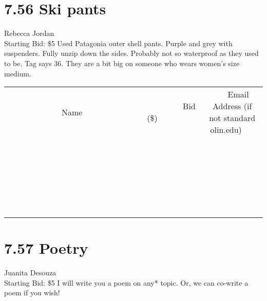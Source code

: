 \documentclass[11pt]{article}
\begin{document}
\section*{7.56 Ski pants}
Rebecca Jordan
\\
Starting Bid: \$5
\newline
Used Patagonia outer shell pants. Purple and grey with suspenders. Fully unzip down the sides. Probably not so waterproof as they used to be. Tag says 36. They are a bit big on someone who wears women's size medium.
\\[6ex]
\begin{tabular}{c c c}
~~~~~~~~~~~~~Name~~~~~~~~~~~~~ & ~~~~~~~~~Bid (\$)~~~~~~~~~  & ~~~Email Address (if not standard olin.edu)~~~\\
 & & \\
\hline
 & & \\
\hline
 & & \\
\hline
 & & \\
\hline
 & & \\
\hline
 & & \\
\hline
 & & \\
\hline
 & & \\
\hline
 & & \\
\hline
 & & \\
\hline
 & & \\
\hline
 & & \\
\hline
 & & \\
\hline
 & & \\
\hline
 & & \\
\hline
 & & \\
\hline
 & & \\
\hline
 & & \\
\hline
 & & \\
\hline
 & & \\
\hline
 & & \\
\hline
 & & \\
\hline
 & & \\
\hline
 & & \\
\hline
 & & \\
\hline
 & & \\
\hline
\end{tabular}
\newpage
\section*{7.57 Poetry}
Juanita Desouza
\\
Starting Bid: \$5
\newline
I will write you a poem on any* topic. Or, we can co-write a poem if you wish! 
\end{document}
